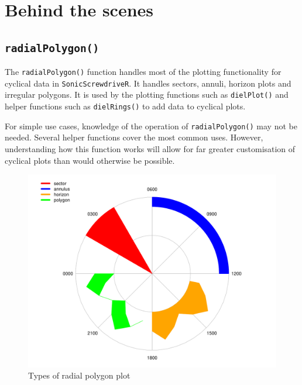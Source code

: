 \documentclass[
]{book}
\begin{document}
\hypertarget{behind-the-scenes}{%
\section{Behind the scenes}\label{behind-the-scenes}}

\hypertarget{radialpolygon}{%
\subsection{\texorpdfstring{\texttt{radialPolygon()}}{radialPolygon()}}\label{radialpolygon}}

The \texttt{radialPolygon()} function handles most of the plotting functionality for cyclical data in \texttt{SonicScrewdriveR}. It handles sectors, annuli, horizon plots and irregular polygons. It is used by the plotting functions such as \texttt{dielPlot()} and helper functions such as \texttt{dielRings()} to add data to cyclical plots.

For simple use cases, knowledge of the operation of \texttt{radialPolygon()} may not be needed. Several helper functions cover the most common uses. However, understanding how this function works will allow for far greater customisation of cyclical plots than would otherwise be possible.

\begin{figure}

{\centering \includegraphics[width=0.9\linewidth]{_main_files/figure-latex/radialPolygon-types-1} 

}

\caption{Types of radial polygon plot}\label{fig:radialPolygon-types}
\end{figure}
\end{document}
